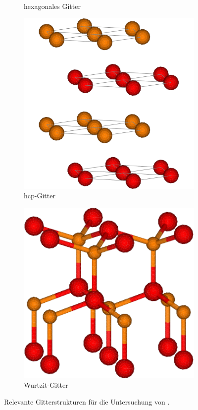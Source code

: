 \begin{figure}
\begin{subfigure}[t]{0.3\textwidth}
        \caption{hexagonales Gitter} \label{hex}
    \end{subfigure}
    \begin{subfigure}[t]{0.3\textwidth}
        \centering
        \includegraphics[width=\textwidth]{../assets/theorie/hcp.pdf}
        \caption{hcp-Gitter} \label{hcp}
    \end{subfigure}
    \begin{subfigure}[t]{0.3\textwidth}
        \centering
        \includegraphics[width=\textwidth]{../assets/theorie/wurzite.pdf}
        \caption{Wurtzit-Gitter} \label{wurtzit}
    \end{subfigure}
    \caption{Relevante Gitterstrukturen für die Untersuchung von \heo.} \label{gitterstrukturen}
\end{figure}

